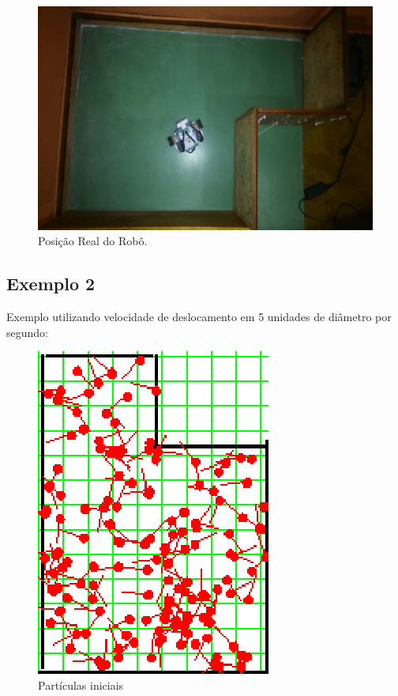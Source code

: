 \begin{figure}[H]
  \centering
  \includegraphics[scale=1]{figuras/cen3_ex1/real.eps}
  \caption[Posição Real do Robô]{Posição Real do Robô.}
  \label{img:cen3_ex1_real}
\end{figure}


\subsection{Exemplo 2}

Exemplo utilizando velocidade de deslocamento em 5 unidades de diâmetro por segundo:

\begin{figure}[H]
  \centering
  \includegraphics[scale=1]{figuras/cen3_ex2/1.eps}
  \caption[Partículas Iniciais]{Partículas iniciais}
  \label{img:cen3_ex2_1}
\end{figure}

